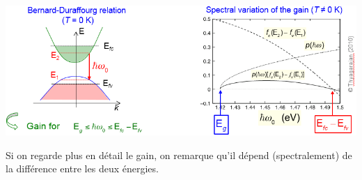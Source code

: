 	\begin{center}
	\includegraphics[scale=0.6]{ch5/image27}
	\end{center}
	Si on regarde plus en détail le gain, on remarque qu'il dépend (spectralement) de la différence 
	entre les deux énergies.\\
	
